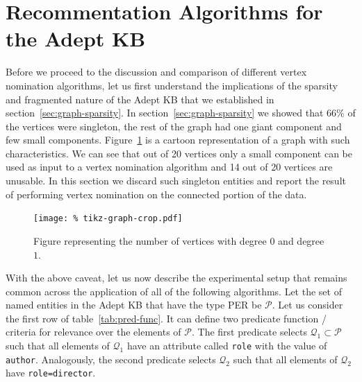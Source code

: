 \documentclass[paper=a4,fontsize=11pt]{scrartcl}
\newcommand{\secref}[1]{section~\ref{#1}}
\newcommand{\tabref}[1]{table~\ref{#1}}
\newcommand{\Figref}[1]{Figure~\ref{#1}}
\numberwithin{equation}{section}    %
\numberwithin{figure}{section}      %
\numberwithin{table}{section}       %
\begin{document}
\section{Recommentation Algorithms for the Adept KB}
\label{sec:er-algorithms}
Before we proceed to the discussion and comparison of different vertex
nomination algorithms, let us first understand the implications of the sparsity
and fragmented nature of the Adept KB that we established in
\secref{sec:graph-sparsity}.  In \secref{sec:graph-sparsity} we showed that
$66\%$ of the vertices were singleton, the rest of the graph had one giant
component and few small components.  \Figref{fig:adept-cartoon} is a cartoon
representation of a graph with such characteristics.  We can see that out of 20
vertices only a small component can be used as input to a vertex nomination
algorithm and 14 out of 20 vertices are unusable. In this section we discard
such singleton entities and report the result of performing vertex nomination on
the connected portion of the data.
\begin{figure}[htbp]
  \centering
  \texttt{[image: \%
    tikz-graph-crop.pdf]}
  \caption{Figure representing the number of vertices with degree $0$ and degree
    $1$.}
  \label{fig:adept-cartoon}
\end{figure}
With the above caveat, let us now describe the experimental setup
that remains common across the application of all of the following
algorithms. Let the set of named entities in
the Adept KB that have the type \textsc{PER} be $\mathcal{P}$.  Let us consider
the first row of \tabref{tab:pred-func}.  It can define two predicate function /
criteria for relevance over the elements of $\mathcal{P}$.  The first predicate
selects $\mathcal{Q_1} \subset \mathcal{P}$ such that all elements of
$\mathcal{Q_1}$ have an attribute called \texttt{role} with the value of
\texttt{author}.  Analogously, the second predicate selects $\mathcal{Q}_2$ such
that all elements of $\mathcal{Q}_2$ have \texttt{role=director}.
\end{document}
